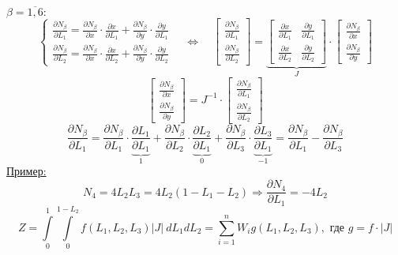 	$\beta=\overline{1, 6}:$
	\[
	\begin{cases}
		\frac{\partial N_{\beta}}{\partial L_1} = \frac{\partial N_{\beta}}{\partial x} \cdot \frac{\partial x}{\partial L_1} + \frac{\partial N_{\beta}}{\partial y} \cdot \frac{\partial y}{\partial L_1} \\
		\frac{\partial N_{\beta}}{\partial L_2} = \frac{\partial N_{\beta}}{\partial x} \cdot \frac{\partial x}{\partial L_2} + \frac{\partial N_{\beta}}{\partial y} \cdot \frac{\partial y}{\partial L_2}
	\end{cases} \quad \Leftrightarrow \quad \begin{bmatrix}
	\frac{\partial N_{\beta}}{\partial L_1} \\ \frac{\partial N_{\beta}}{\partial L_2}
	\end{bmatrix} = \underbrace{\begin{bmatrix}
	\frac{\partial x}{\partial L_1} & \frac{\partial y}{\partial L_1} \\ \frac{\partial x}{\partial L_2} & \frac{\partial y}{\partial L_2} 
	\end{bmatrix}}_J \cdot \begin{bmatrix}
 	\frac{\partial N_{\beta}}{\partial x} \\ \frac{\partial N_{\beta}}{\partial y}
	\end{bmatrix}
	\]
	\[
	\begin{bmatrix}
		\frac{\partial N_{\beta}}{\partial x} \\ \frac{\partial N_{\beta}}{\partial y}
	\end{bmatrix} = J^{-1} \cdot \begin{bmatrix}
	\frac{\partial N_{\beta}}{\partial L_1} \\ \frac{\partial N_{\beta}}{\partial L_2}
	\end{bmatrix}
	\]
	\[
	\frac{\partial N_{\beta}}{\partial L_1}= \frac{\partial N_{\beta}}{\partial L_1}\cdot \underbrace{\frac{\partial L_1}{\partial L_1}}_1 + \frac{\partial N_{\beta}}{\partial L_2}\cdot \underbrace{\frac{\partial L_2}{\partial L_1}}_0+\frac{\partial N_{\beta}}{\partial L_3}\cdot \underbrace{\frac{\partial L_3}{\partial L_1}}_{-1}=\frac{\partial N_{\beta}}{\partial L_1}-\frac{\partial N_{\beta}}{\partial L_3}
	\]
	\underline{Пример:}
	\[
	N_4=4L_2L_3=4L_2(1-L_1-L_2)\Rightarrow \frac{\partial N_4}{\partial L_1}=-4L_2
	\]
	\[
	Z=\int\limits_0^1\int\limits_0^{1-L_2} f(L_1, L_2, L_3)|J|\ dL_1dL_2 = \sum\limits_{i=1}^{n} W_i g (L_1,L_2,L_3), \text{ где } g=f\cdot|J|
	\]
